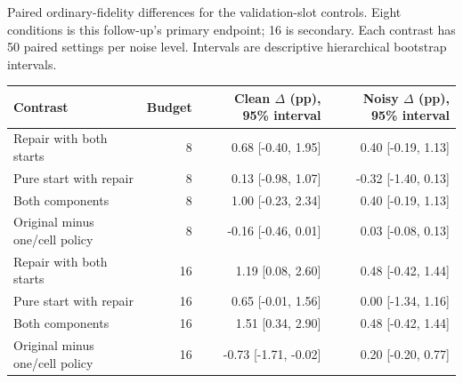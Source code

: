 \begin{kbtable}
\centering
\caption{Paired ordinary-fidelity differences for the validation-slot controls. Eight conditions is this follow-up's primary endpoint; 16 is secondary. Each contrast has 50 paired settings per noise level. Intervals are descriptive hierarchical bootstrap intervals.}
\label{tab:followup_slot_differences}
\small
\begin{adjustbox}{max width=\linewidth}
\begin{tabular}{lrrr}
\toprule
Contrast & Budget & Clean $\Delta$ (pp), 95\% interval & Noisy $\Delta$ (pp), 95\% interval \\
\midrule
Repair with both starts & 8 & 0.68 [-0.40, 1.95] & 0.40 [-0.19, 1.13] \\
Pure start with repair & 8 & 0.13 [-0.98, 1.07] & -0.32 [-1.40, 0.13] \\
Both components & 8 & 1.00 [-0.23, 2.34] & 0.40 [-0.19, 1.13] \\
Original minus one/cell policy & 8 & -0.16 [-0.46, 0.01] & 0.03 [-0.08, 0.13] \\
Repair with both starts & 16 & 1.19 [0.08, 2.60] & 0.48 [-0.42, 1.44] \\
Pure start with repair & 16 & 0.65 [-0.01, 1.56] & 0.00 [-1.34, 1.16] \\
Both components & 16 & 1.51 [0.34, 2.90] & 0.48 [-0.42, 1.44] \\
Original minus one/cell policy & 16 & -0.73 [-1.71, -0.02] & 0.20 [-0.20, 0.77] \\
\bottomrule
\end{tabular}
\end{adjustbox}
\end{kbtable}
